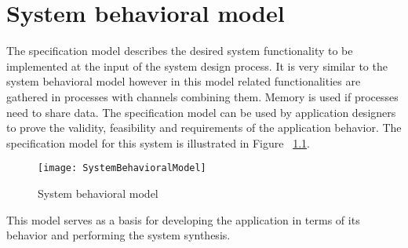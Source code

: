 \chapter{System behavioral model}

The specification model describes the desired system functionality to be implemented at the input of the system design process. It is very similar to the system behavioral model however in this model related functionalities are gathered in processes with channels combining them. Memory is used if processes need to share data. The specification model can be used by application designers to prove the validity, feasibility and requirements of the application behavior.
The specification model for this system is illustrated in Figure ~\ref{fig:SystemBehavioralModel}.

\begin{figure}[H]
\centering
\texttt{[image: SystemBehavioralModel]}
\caption{System behavioral model}
\label{fig:SystemBehavioralModel}
\end{figure}

This model serves as a basis for developing the application in terms of its behavior and performing the system synthesis.